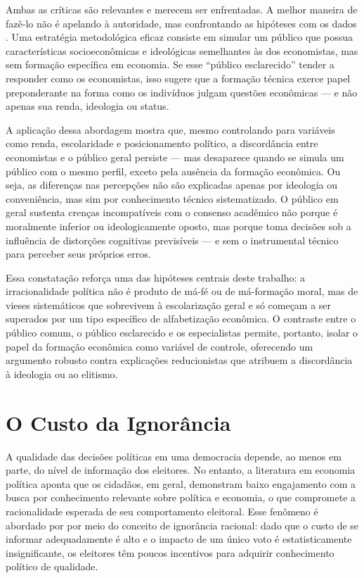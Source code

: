 Ambas as críticas são relevantes e merecem ser enfrentadas. A melhor maneira de fazê-lo não é apelando à autoridade, mas confrontando as hipóteses com os dados \cite{popperlogic}. Uma estratégia metodológica eficaz consiste em simular um público que possua características socioeconômicas e ideológicas semelhantes às dos economistas, mas sem formação específica em economia. Se esse “público esclarecido” tender a responder como os economistas, isso sugere que a formação técnica exerce papel preponderante na forma como os indivíduos julgam questões econômicas — e não apenas sua renda, ideologia ou status.

A aplicação dessa abordagem mostra que, mesmo controlando para variáveis como renda, escolaridade e posicionamento político, a discordância entre economistas e o público geral persiste — mas desaparece quando se simula um público com o mesmo perfil, exceto pela ausência da formação econômica. Ou seja, as diferenças nas percepções não são explicadas apenas por ideologia ou conveniência, mas sim por conhecimento técnico sistematizado. O público em geral sustenta crenças incompatíveis com o consenso acadêmico não porque é moralmente inferior ou ideologicamente oposto, mas porque toma decisões sob a influência de distorções cognitivas previsíveis — e sem o instrumental técnico para perceber seus próprios erros.

Essa constatação reforça uma das hipóteses centrais deste trabalho: a irracionalidade política não é produto de má-fé ou de má-formação moral, mas de vieses sistemáticos que sobrevivem à escolarização geral e só começam a ser superados por um tipo específico de alfabetização econômica. O contraste entre o público comum, o público esclarecido e os especialistas permite, portanto, isolar o papel da formação econômica como variável de controle, oferecendo um argumento robusto contra explicações reducionistas que atribuem a discordância à ideologia ou ao elitismo.

\section{O Custo da Ignorância} %


A qualidade das decisões políticas em uma democracia depende, ao menos em parte, do nível de informação dos eleitores. No entanto, a literatura em economia política aponta que os cidadãos, em geral, demonstram baixo engajamento com a busca por conhecimento relevante sobre política e economia, o que compromete a racionalidade esperada de seu comportamento eleitoral. Esse fenômeno é abordado por  por meio do conceito de ignorância racional: dado que o custo de se informar adequadamente é alto e o impacto de um único voto é estatisticamente insignificante, os eleitores têm poucos incentivos para adquirir conhecimento político de qualidade.

